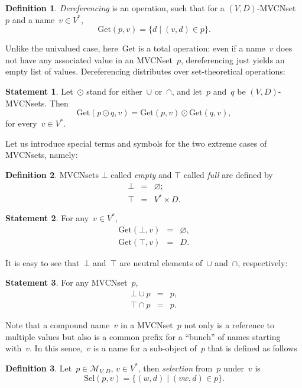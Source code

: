 \documentclass{article}
\theoremstyle{definition}
\newtheorem{Df}{Definition}
\newtheorem{St}{Statement}
\newcommand{\setcharmvcn}{M}
\newcommand{\setsymbol}[3]{\mathcal{#1}_{#2,#3}}
\newcommand{\setmvcn}[2]{\setsymbol{\setcharmvcn}{#1}{#2}}
\newcommand{\select}{\mathrm{Sel}}
\newcommand{\derefsymbol}{\mathrm{Get}}
\newcommand{\deref}[2]{\derefsymbol(#1, #2)}
\begin{document}
\begin{Df}\label{df:mvcn-dereferencing}
\emph{Dereferencing} is an operation, such that for
a $(V,D)$-MVCNset~$p$ and a name~$v\in V^\ast$,
\[
  \deref{p}{v} = \{ d \mid (v, d) \in p \} .
\]
\end{Df}

Unlike the univalued case, here~$\derefsymbol$ is a total operation: even if a
name~$v$ does not have any associated value in an MVCNset~$p$, dereferencing
just yields an empty list of values.  Dereferencing distributes over
set-theoretical operations:
\begin{St}\label{st:mvcn-deref-distributivity}
Let~$\odot$ stand for either~$\cup$ or~$\cap$, and let~$p$ and~$q$ be
$(V,D)$-MVCNsets. Then
\[
  \deref{p\odot q}{v} = \deref{p}{v} \odot \deref{q}{v} ,
\]
for every~$v\in V^\ast$.
\end{St}

Let us introduce special terms and symbols for the two extreme cases of
MVCNsets, namely:
\begin{Df}\label{df:mvcn-extremes}
MVCNsets $\bot$ called \emph{empty} and $\top$ called \emph{full} are defined by
\begin{eqnarray*}
  \bot &  = &  \varnothing ; \\
  \top &  = &  V^\ast \times D .
\end{eqnarray*}
\end{Df}

\begin{St}\label{st:mvcn-extreme-deref}
For any~$v\in V^\ast$,
\begin{eqnarray*}
  \deref{\bot}{v} & = & \varnothing, \\
  \deref{\top}{v} & = & D .
\end{eqnarray*}
\end{St}

It is easy to see that~$\bot$ and~$\top$ are neutral elements
of~$\cup$ and~$\cap$, respectively:
\begin{St}\label{st:mvcn-neutrals}
For any MVCNset~$p$,
\begin{eqnarray*}
  \bot \cup p & = & p, \\
  \top \cap p & = & p .
\end{eqnarray*}
\end{St}

Note that a compound name~$v$ in a MVCNset~$p$ not only is a reference to
multiple values but also is a common prefix for a ``bunch'' of names starting
with~$v$. In this sence,~$v$ is a name for a sub-object of~$p$ that is
defined as follows
\begin{Df}\label{df:mvcn-select}
Let~$p\in\setmvcn{V}{D}$, $v\in V^\ast$, then \emph{selection} from~$p$
under~$v$ is
\[
  \select(p,v) = \{ (w, d) \mid (vw, d)\in p \} .
\]
\end{Df}
\end{document}

